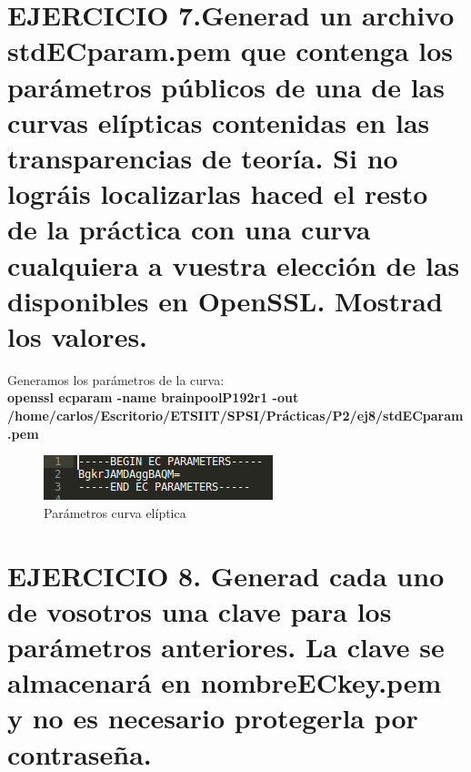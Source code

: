


\section{EJERCICIO 7.Generad un archivo stdECparam.pem que contenga los parámetros públicos de una de las curvas elípticas contenidas en las transparencias de teoría. Si no lográis localizarlas haced el resto de la práctica con una curva cualquiera a vuestra elección de las disponibles en OpenSSL. Mostrad los valores.}


Generamos los parámetros de la curva:\\
\textbf{openssl ecparam -name brainpoolP192r1 -out\\ /home/carlos/Escritorio/ETSIIT/SPSI/Prácticas/P2/ej8/stdECparam.pem}

\begin{figure}[H] %
	\centering
	\includegraphics[scale=1]{imagenes/stdECparam} 
	\caption{Parámetros curva elíptica} \label{etiq}
\end{figure}










\section{EJERCICIO 8. Generad cada uno de vosotros una clave para los parámetros anteriores. La clave se almacenará en nombreECkey.pem y no es necesario protegerla por contraseña. }

